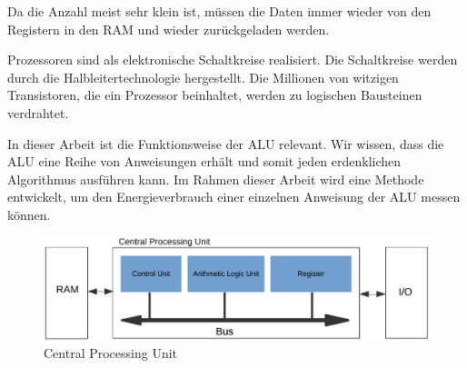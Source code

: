 Da die Anzahl meist sehr klein ist, müssen die Daten immer wieder von den Registern in den RAM und wieder zurückgeladen werden.
\par
Prozessoren sind als elektronische Schaltkreise realisiert. Die Schaltkreise werden durch die Halbleitertechnologie hergestellt. Die Millionen von witzigen Transistoren, die ein Prozessor beinhaltet, werden zu logischen Bausteinen verdrahtet.
\par
In dieser Arbeit ist die Funktionsweise der ALU relevant. Wir wissen, dass die ALU eine Reihe von Anweisungen erhält und somit jeden erdenklichen Algorithmus ausführen kann. Im Rahmen dieser Arbeit wird eine Methode entwickelt, um den Energieverbrauch einer einzelnen Anweisung der ALU messen können.



\begin{figure}[t]
\centering
\includegraphics[width=1.0\textwidth]{images/cpu.pdf}
\caption{Central Processing Unit}
\label{fig:CPU}
\end{figure}

